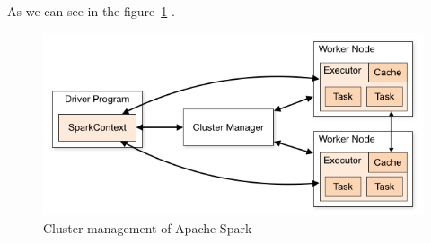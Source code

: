 As we can see in the figure~\ref{fig:clusters-spark} .
\begin{figure}[H]
	\centering
	\includegraphics[scale=0.5]{figs/cluster-overview.png}
	\caption{Cluster management of Apache Spark}
	\label{fig:clusters-spark}
\end{figure}

